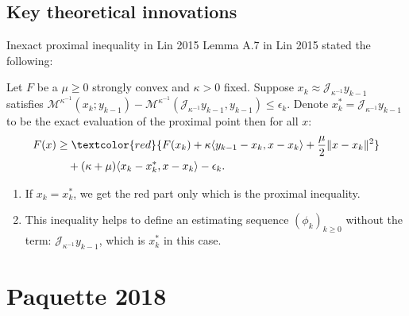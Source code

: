 \documentclass[11pt]{beamer}
\begin{document}
        \subsection{Key theoretical innovations}
            \begin{frame}{Inexact proximal inequality in Lin 2015}
                Lemma A.7 in Lin 2015 \cite{lin_universal_2015} stated the following: 
                \begin{lemma}
                    Let $F$ be a $\mu\ge 0$ strongly convex and $\kappa > 0$ fixed. 
                    Suppose $x_k \approx \mathcal J_{\kappa^{-1}} y_{k - 1}$ satisfies $\mathcal M^{\kappa^{-1}}(x_k; y_{k - 1}) - \mathcal M^{\kappa^{-1}}(\mathcal J_{\kappa^{-1}} y_{k - 1}, y_{k - 1}) \le \epsilon_k$. 
                    Denote $x_k^* = \mathcal J_{\kappa^{-1}} y_{k - 1}$ to be the exact evaluation of the proximal point then for all $x$: 
                        \begin{align*}   
                            F(x) &\ge 
                            \textcolor{red}{
                                F(x_k) + \kappa \langle y_{k - 1} - x_k, x - x_k\rangle
                                + \frac{\mu}{2}\Vert x - x_k\Vert^2 
                            }
                            \\
                            & \quad 
                            + (\kappa + \mu)\langle  x_k - x_k^*, x - x_k\rangle 
                            - \epsilon_k.
                        \end{align*}
                \end{lemma}
                \begin{enumerate}
                    \item If $x_k=x^*_k$, we get the red part only which is the proximal inequality. 
                    \item This inequality helps to define an estimating sequence $(\phi_k)_{k \ge 0}$ without the term: $\mathcal J_{\kappa^{-1}}y_{k - 1}$, which is $x_k^*$ in this case. 
                \end{enumerate}
            \end{frame}

\section{Paquette 2018}
\end{document}
